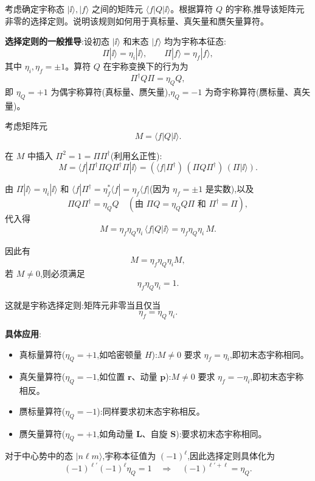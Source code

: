 \begin{question}
考虑确定宇称态 $|\ii\rangle,|f\rangle$ 之间的矩阵元 $\langle f|Q|\ii\rangle$。根据算符 $Q$ 的宇称,推导该矩阵元非零的选择定则。说明该规则如何用于真标量、真矢量和赝矢量算符。
\begin{solution}
	\textbf{选择定则的一般推导}:设初态 $|\ii\rangle$ 和末态 $|f\rangle$ 均为宇称本征态:
	\[
	\Pi|\ii\rangle=\eta_i|\ii\rangle,\qquad \Pi|f\rangle=\eta_f|f\rangle,
	\]
	其中 $\eta_i,\eta_f=\pm1$。算符 $Q$ 在宇称变换下的行为为
	\[
	\Pi^\dagger Q\Pi = \eta_Q Q,
	\]
	即 $\eta_Q=+1$ 为偶宇称算符(真标量、赝矢量),$\eta_Q=-1$ 为奇宇称算符(赝标量、真矢量)。

	考虑矩阵元
	\[
	M = \langle f|Q|\ii\rangle.
	\]

	在 $M$ 中插入 $\Pi^2=1 = \Pi\Pi^\dagger$(利用幺正性):
	\[
	M = \langle f|\Pi^\dagger\Pi Q \Pi^\dagger\Pi|\ii\rangle
	= (\langle f|\Pi^\dagger)\,(\Pi Q\Pi^\dagger)\,(\Pi|\ii\rangle).
	\]

	由 $\Pi|\ii\rangle=\eta_i|\ii\rangle$ 和 $\langle f|\Pi^\dagger = \eta_f^*\langle f| = \eta_f\langle f|$(因为 $\eta_f=\pm1$ 是实数),以及
	\[
	\Pi Q\Pi^\dagger = \eta_Q Q \quad(\text{由 }\Pi Q = \eta_Q Q\Pi\text{ 和 }\Pi^\dagger=\Pi),
	\]
	代入得
	\[
	M = \eta_f\eta_Q\eta_i\,\langle f|Q|\ii\rangle = \eta_f\eta_Q\eta_i\,M.
	\]

	因此有
	\[
	M = \eta_f\eta_Q\eta_i M,
	\]
	若 $M\neq0$,则必须满足
	\[
	\eta_f\eta_Q\eta_i = 1.
	\]

	这就是宇称选择定则:矩阵元非零当且仅当
	\[
	\boxed{\eta_f = \eta_Q\,\eta_i}.
	\]

	\textbf{具体应用}:
	\begin{itemize}
	\item 真标量算符($\eta_Q=+1$,如哈密顿量 $H$):$M\neq0$ 要求 $\eta_f=\eta_i$,即初末态宇称相同。
	\item 真矢量算符($\eta_Q=-1$,如位置 $\mathbf r$、动量 $\mathbf p$):$M\neq0$ 要求 $\eta_f=-\eta_i$,即初末态宇称相反。
	\item 赝标量算符($\eta_Q=-1$):同样要求初末态宇称相反。
	\item 赝矢量算符($\eta_Q=+1$,如角动量 $\mathbf L$、自旋 $\mathbf S$):要求初末态宇称相同。
	\end{itemize}

	对于中心势中的态 $|n\ell m\rangle$,宇称本征值为 $(-1)^\ell$,因此选择定则具体化为
	\[
	(-1)^{\ell'}(-1)^{\ell}\eta_Q = 1 \quad\Longrightarrow\quad (-1)^{\ell'+\ell} = \eta_Q.
	\]
	\end{solution}
\end{question}

